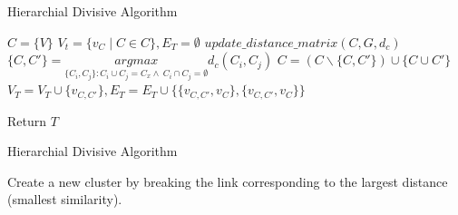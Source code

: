 \documentclass[a4paper]{article}
\begin{document}
  \begin{algorithm}
   \caption{Hierarchial Divisive Algorithm ~\cite{hda1}}
    \begin{algorithmic}[1]
     \State $C = \{ V\} $ 
     \State $V_t = \{v_C\mid C \in C\},E_T = \emptyset$ 
     \State $update\_distance\_matrix(C,G,d_c)$
     \State $\{C,C'\} =  \underset{\{C_i,C_j\}  : C_i \cup C_j = C_x   \wedge \  C_i \cap C_j = \emptyset}{argmax} d_c (C_i,C_j)$
     \State $C = (C \backslash \{C,C'\}) \cup \{C \cup C'\}$ 
     \State $V_T = V_T \cup \{v_{C,C'}\},E_T = E_T \cup \{\{v_{C,C'} ,v_{C}\},\{v_{C,C'} ,v_{C}\}\}$ 
     \EndWhile
    
      
        
       
       \State Return $T$



 

\end{algorithmic}
\end{algorithm}


\begin{algorithm}
   \caption{Hierarchial Divisive Algorithm ~\cite{hda1} }
    \begin{algorithmic}[1]
     
       
     \State Create a new cluster by breaking the link corresponding to the largest distance (smallest
similarity).

   \EndWhile



\end{algorithmic}
\end{algorithm}
\end{document}
